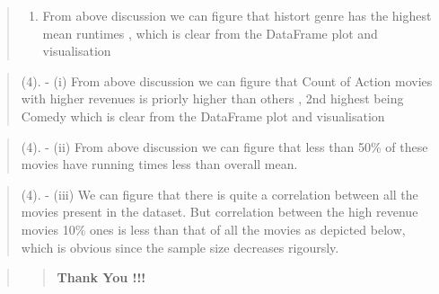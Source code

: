 \documentclass[11pt]{article}
\providecommand{\tightlist}{%
      \setlength{\itemsep}{0pt}\setlength{\parskip}{0pt}}
\begin{document}
\begin{quote}
\begin{enumerate}
\def\labelenumi{(\arabic{enumi})}
\setcounter{enumi}{2}
\tightlist
\item
  From above discussion we can figure that histort genre has the highest
  mean runtimes , which is clear from the DataFrame plot and
  visualisation
\end{enumerate}
\end{quote}

\begin{quote}
(4). - (i) From above discussion we can figure that Count of Action
movies with higher revenues is priorly higher than others , 2nd highest
being Comedy which is clear from the DataFrame plot and visualisation
\end{quote}

\begin{quote}
(4). - (ii) From above discussion we can figure that less than 50\% of
these movies have running times less than overall mean.
\end{quote}

\begin{quote}
(4). - (iii) We can figure that there is quite a correlation between all
the movies present in the dataset. But correlation between the high
revenue movies 10\% ones is less than that of all the movies as depicted
below, which is obvious since the sample size decreases rigoursly.
\end{quote}

\begin{quote}
\begin{quote}
\textbf{Thank You !!!}
\end{quote}
\end{quote}


    
    
    
    
\end{document}
